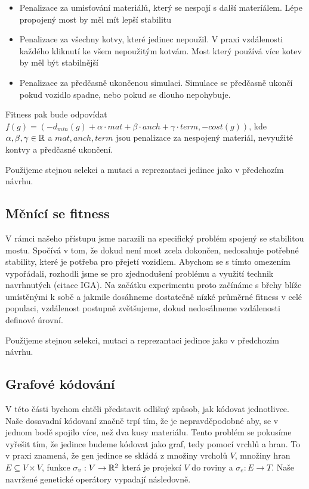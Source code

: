 \begin{itemize}
    \item Penalizace za umisťování materiálů, který se nespojí s další materíálem. Lépe propojený most by měl mít lepší stabilitu
    \item Penalizace za všechny kotvy, které jedinec nepoužil. V praxi vzdálenosti každého kliknutí ke všem nepoužitým kotvám. Most který používá více kotev by měl být stabilnější
    \item Penalizace za předčasně ukončenou simulaci. Simulace se předčasně ukončí pokud vozidlo spadne, nebo pokud se dlouho nepohybuje.
\end{itemize}

Fitness pak bude odpovídat $f(g) = (-d_{min}(g) + \alpha \cdot mat + \beta \cdot anch + \gamma \cdot term, -cost(g))$, kde $\alpha, \beta, \gamma \in \mathbb{R}$ a $mat, anch, term$ jsou penalizace za nespojený materiál, nevyužité kontvy a předčasné ukončení.

Použijeme stejnou selekci a mutaci a reprezantaci jedince jako v předchozím návrhu.

\subsection{Měnící se fitness}

V rámci našeho přístupu jsme narazili na specifický problém spojený se stabilitou mostu. Spočívá v tom, že dokud není most zcela dokončen, nedosahuje potřebné stability, které je potřeba pro přejetí vozidlem. Abychom se s tímto omezením vypořádali, rozhodli jsme se pro zjednodušení problému a využití technik navrhnutých (citace IGA). Na začátku experimentu proto začínáme s břehy blíže umístěnými k sobě a jakmile dosáhneme dostatečně nízké průměrné fitness v celé populaci, vzdálenost postupně zvětšujeme, dokud nedosáhneme vzdálenosti definové úrovní. 

Použijeme stejnou selekci, mutaci a reprezantaci jedince jako v předchozím návrhu.

\subsection{Grafové kódování}

V této části bychom chtěli představit odlišný způsob, jak kódovat jednotlivce. Naše dosavadní kódovaní značně trpí tím, že je nepravděpodobné aby, se v jednom bodě spojilo více, než dva kusy materiálu. Tento problém se pokusíme vyřešit tím, že jedince budeme kódovat jako graf, tedy pomocí vrchlů a hran. To v praxi znamená, že gen jedince se skládá z množiny vrcholů $V$, množiny hran $E \subseteq V \times V$, funkce $\sigma_v : V \rightarrow \mathbb{R}^2$ která je projekcí $V$ do roviny a $\sigma_e : E \rightarrow T$. Naše navržené genetické operátory vypadají následovně.

